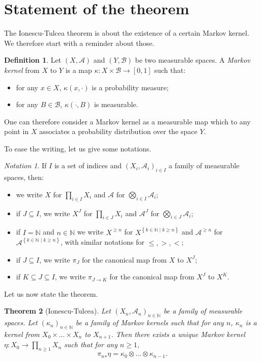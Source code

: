 \documentclass{article}
\newcommand{\A}{\mathcal{A}}
\newcommand{\B}{\mathcal{B}}
\newcommand{\N}{\mathbb{N}}
\newcommand{\set}[1]{\left\{#1\right\}}
\newcommand{\Xge}[1]{X^{\ge#1}}
\newcommand{\Age}[1]{\mathcal{A}^{\ge#1}}
\newtheorem{thm}{Theorem}[section]
\theoremstyle{definition}
\newtheorem{defi}[thm]{Definition}
\theoremstyle{remark}
\newtheorem*{nota}{Notation}
\begin{document}
	\section{Statement of the theorem}
	The Ionescu-Tulcea theorem is about the existence of a certain Markov kernel. We therefore start with a reminder about those.

	\begin{defi}\label{def:markov-kernel}
		Let $(X,\A)$ and $(Y,\B)$ be two measurable spaces. A \emph{Markov kernel} from $X$ to $Y$ is a map $\kappa : X \times \B \to [0,1]$ such that:
		\begin{itemize}
			\item for any $x \in X$, $\kappa(x,\cdot)$ is a probability measure;
			\item for any $B \in \B$, $\kappa(\cdot,B)$ is measurable.
		\end{itemize}
		One can therefore consider a Markov kernel as a measurable map which to any point in $X$ associates a probability distribution over the space $Y$.
	\end{defi}

	To ease the writing, let us give some notations.

	\begin{nota}
		If $I$ is a set of indices and $(X_i, \A_i)_{i \in I}$ a family of measurable spaces, then:
		\begin{itemize}
			\item we write $X$ for $\prod_{i \in I} X_i$ and $\A$ for $\bigotimes_{i \in I} \A_i$;
			\item if $J \subseteq I$, we write $X^J$ for $\prod_{i \in J} X_i$ and $\A^J$ for $\bigotimes_{i \in J} \A_i$;
			\item if $I = \N$ and $n \in \N$ we write $\Xge{n}$ for $X^{\set{k \in \N \mid k \ge n}}$ and $\Age{n}$ for $\A^{\set{k \in \N \mid k \ge n}}$, with similar notations for $\le, >, <$;
			\item if $J \subseteq I$, we write $\pi_J$ for the canonical map from $X$ to $X^J$;
			\item if $ K \subseteq J \subseteq I$, we write $\pi_{J\to K}$ for the canonical map from $X^J$ to $X^K$.
		\end{itemize}
	\end{nota}

	Let us now state the theorem.

	\begin{thm}[Ionescu-Tulcea]\label{thm:it}
		Let $(X_n,\A_n)_{n\in\N}$ be a family of measurable spaces. Let $(\kappa_n)_{n\in\N}$ be a family of Markov kernels such that for any $n$, $\kappa_n$ is a kernel from $X_0 \times ... \times X_n$ to $X_{n+1}$. Then there exists a unique Markov kernel $\eta : X_0 \to \prod_{n\ge1}X_n$ such that for any $n\ge1$,
		$${\pi_n}_*\eta = \kappa_0 \otimes ... \otimes \kappa_{n-1}.$$
	\end{thm}
\end{document}
